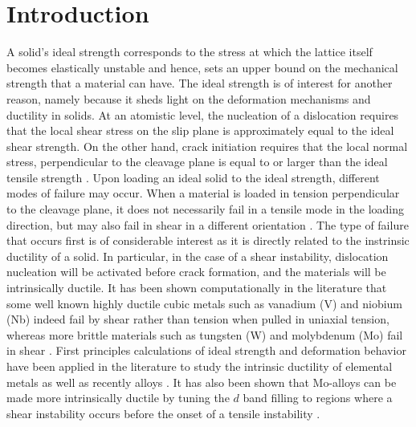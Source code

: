 \documentclass[showpacs,aps,floatfix,prb,reprint,superscriptaddress]{revtex4-1}
\begin{document}
\section{Introduction}
A solid's ideal strength corresponds to the stress at which the lattice itself becomes elastically unstable and hence, sets an upper bound on the mechanical strength that a material can have. The ideal strength is of interest for another reason, namely because it sheds light on the deformation mechanisms and ductility in solids. At an atomistic level, the nucleation of a dislocation requires that the local shear stress on the slip plane is approximately equal to the ideal shear strength. On the other hand, crack initiation requires that the local normal stress, perpendicular to the cleavage plane is equal to or larger than the ideal tensile strength \cite{li2007ideal,clatterbuck2003ideal,kelly1986strong,wang2013estimate}. Upon loading an ideal solid to the ideal strength, different modes of failure may occur. When a material is loaded in tension perpendicular to the cleavage plane, it does not necessarily fail in a tensile mode in the loading direction, but may also fail in shear in a different orientation \cite{PhysRevLett.91.135501,PhysRevLett.112.115503,macmillan1983ideal,roundy2001ideal,wang2009elastic}. The type of failure that occurs first is of considerable interest as it is directly related to the instrinsic ductility of a solid. In particular, in the case of a shear instability, dislocation nucleation will be activated before crack formation, and the materials will be intrinsically ductile. It has been shown computationally in the literature that some well known highly ductile cubic metals such as vanadium (V) and niobium (Nb) indeed fail by shear rather than tension when pulled in uniaxial tension, whereas more brittle materials such as tungsten (W) and molybdenum (Mo) fail in shear \cite{PhysRevLett.112.115503}. First principles calculations of ideal strength and deformation behavior have been applied in the literature to study the intrinsic ductility of elemental metals as well as recently alloys \cite{PhysRevLett.82.2713,PhysRevB.87.214203,vsob1997theoretical,PhysRevB.58.6006}. It has also been shown that Mo-alloys can be made more intrinsically ductile by tuning the $d$ band filling to regions where a shear instability occurs before the onset of a tensile instability \cite{PhysRevLett.112.115503}.  \\
\end{document}
